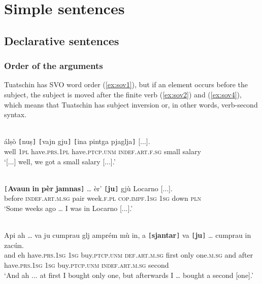\chapter{Simple sentences}

\section{Declarative sentences}


\subsection{Order of the arguments}
Tuatschin has SVO word order (\ref{ex:sov1}), but if an element occurs before the subject, the subject is moved after the finite verb (\ref{ex:sov2}) and (\ref{ex:sov4}), which means that Tuatschin has subject inversion or, in other words, verb-second syntax.

\ea
\label{ex:sov1}
\\
	\gll    [...] álṣò \texttt{[}nuṣ\texttt{]} \texttt{[}vajn gju\texttt{]} \texttt{[}ina pintga pjaglja\texttt{]} [...].\\
 {} well \textsc{1pl} have.\textsc{prs.1pl}  have.\textsc{ptcp.unm} \textsc{indef.art.f.sg} small salary \\
\glt `[...] well, we got a small salary [...].'
\z

\ea
\label{ex:sov2}
\\
\gll \texttt{[}\textbf{Avaun} \textbf{in} \textbf{pèr} \textbf{jamnas}\texttt{]} … èr’ \texttt{[}\textbf{ju}\texttt{]} gjù Locarno [...].\\
before \textsc{indef.art.m.sg} pair week.\textsc{f.pl} {} \textsc{cop.impf.1sg} \textsc{1sg} down \textsc{pln}\\
\glt `Some weeks ago … I was in Locarno [...].'
\z

\ea
\label{ex:sov4}
\\
\gll  Api ah … va ju cumprau glj amprém mù in, a \texttt{[}\textbf{sjantar}\texttt{]} va \texttt{[}{\textbf{ju}}\texttt{]} … cumprau in zacún.\\
and eh {} have.\textsc{prs.1sg} \textsc{1sg} buy.\textsc{ptcp.unm} \textsc{def.art.m.sg} first only one.\textsc{m.sg} and after  have.\textsc{prs.1sg} \textsc{1sg} {} buy.\textsc{ptcp.unm}  \textsc{indef.art.m.sg} second\\
\glt `And ah ... at first I bought only one, but afterwards I … bought a second [one].'
\z


